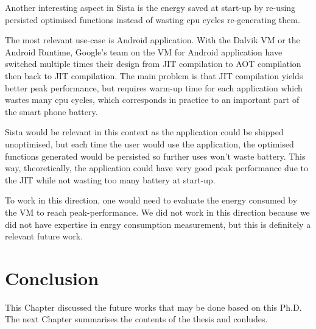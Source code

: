 \documentclass[a4paper,12pt,twoside]{../includes/ThesisStyle}
\begin{document}
Another interesting aspect in Sista is the energy saved at start-up by re-using persisted optimised functions instead of wasting cpu cycles re-generating them. 

The most relevant use-case is Android application. With the Dalvik VM or the Android Runtime, Google's team on the VM for Android application have switched multiple times their design from JIT compilation to AOT compilation then back to JIT compilation. The main problem is that JIT compilation yields better peak performance, but requires warm-up time for each application which wastes many cpu cycles, which corresponds in practice to an important part of the smart phone battery.

Sista would be relevant in this context as the application could be shipped unoptimised, but each time the user would use the application, the optimised functions generated would be persisted so further uses won't waste battery. This way, theoretically, the application could have very good peak performance due to the JIT while not wasting too many battery at start-up.

To work in this direction, one would need to evaluate the energy consumed by the VM to reach peak-performance. We did not work in this direction because we did not have expertise in enrgy consumption measurement, but this is definitely a relevant future work.

\section*{Conclusion}

This Chapter discussed the future works that may be done based on this Ph.D. The next Chapter summarises the contents of the thesis and conludes.

\ifx\wholebook\relax\else
    
\end{document}
